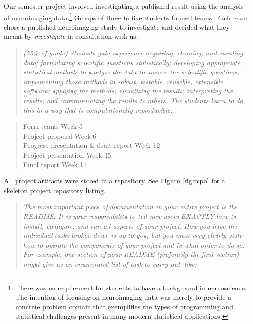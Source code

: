 Our semester project involved investigating a published result using the
analysis of neuroimaging data.\footnote{There was no requirement
for students to have a background in neuroscience.  The intention of focusing
on neuroimaging data was  merely to provide a concrete problem domain that
exemplifies the types of programming and statistical challenges present in many
modern statistical applications.}
Groups of three to five students formed teams.
Each team chose a published neuroimaging study to investigate and
decided what they meant by \emph{investigate} in consultation with us.

\begin{quote}\emph{
(55\% of grade)
Students gain experience acquiring, cleaning, and curating data; formulating
scientific questions statistically; developing appropriate statistical methods
to analyze the data to answer the scientific questions; implementing those
methods in robust, testable, reusable, extensible software; applying the
methods; visualizing the results; interpreting the results; and communicating
the results to others. The students learn to do this in a way that is
computationally reproducible.
}\end{quote}

\begin{quote}
\begin{flushleft}
Form teams \dotfill Week 5\\
Project proposal \dotfill Week 6\\
Progress presentation \& draft report \dotfill Week 12\\
Project presentation \dotfill Week 15\\
Final report \dotfill Week 17\\
\end{flushleft}
\end{quote}

All project artifacts were stored in a repository.
See Figure~\ref{fig:repo} for a skeleton project repository listing.

\begin{quote}\emph{
The most important piece of documentation in your entire project is the README.
It is your responsibility to tell new users EXACTLY how to install, configure,
and run all aspects of your project. How you have the individual tasks broken
down is up to you, but you must very clearly state how to operate the
components of your project and in what order to do so. For example, one section
of your README (preferably the first section) might give us an enumerated list
of task to carry out, like:
}\end{quote}

